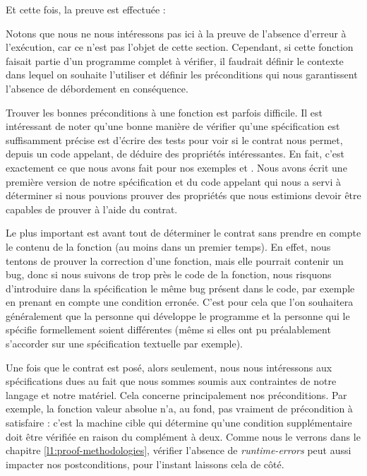 Et cette fois, la preuve est effectuée :





Notons que nous ne nous intéressons pas ici à la preuve de
l'absence d'erreur à l'exécution, car ce n'est pas l'objet de cette section.
Cependant, si cette fonction faisait partie d'un programme complet à vérifier,
il faudrait définir le contexte dans lequel on souhaite l'utiliser et définir
les préconditions qui nous garantissent l'absence de débordement en conséquence.




Trouver les bonnes préconditions à une fonction est parfois difficile. Il est
intéressant de noter qu'une bonne manière de vérifier qu'une spécification est
suffisamment précise est d'écrire des tests pour voir si le contrat nous permet,
depuis un code appelant, de déduire des propriétés intéressantes. En fait,
c'est exactement ce que nous avons fait pour nos exemples  et
. Nous avons écrit une première version de notre spécification
et du code appelant qui nous a servi à déterminer si nous pouvions prouver des
propriétés que nous estimions devoir être capables de prouver à l'aide du
contrat.



Le plus important est avant tout de déterminer le contrat sans prendre en compte
le contenu de la fonction (au moins dans un premier temps). En effet, nous
tentons de prouver la correction d'une fonction, mais elle pourrait contenir un
bug, donc si nous suivons de trop près le code de la fonction, nous risquons
d'introduire dans la spécification le même bug présent dans le code, par exemple
en prenant en compte une condition erronée. C'est pour cela que
l'on souhaitera généralement que la personne qui développe le programme et la
personne qui le spécifie formellement soient différentes (même si elles ont pu
préalablement s'accorder sur une spécification textuelle par exemple).



Une fois que le contrat est posé, alors seulement, nous nous intéressons aux
spécifications dues au fait que nous sommes soumis aux contraintes de notre langage
et notre matériel. Cela concerne principalement nos préconditions. Par exemple,
la fonction valeur absolue n'a, au fond, pas vraiment de précondition à
satisfaire : c'est la machine cible qui détermine qu'une condition supplémentaire
doit être vérifiée en raison du complément à deux. Comme nous le verrons dans le
chapitre \ref{l1:proof-methodologies}, vérifier l'absence de \textit{runtime-errors}
peut aussi impacter nos postconditions, pour l'instant laissons cela de côté.


